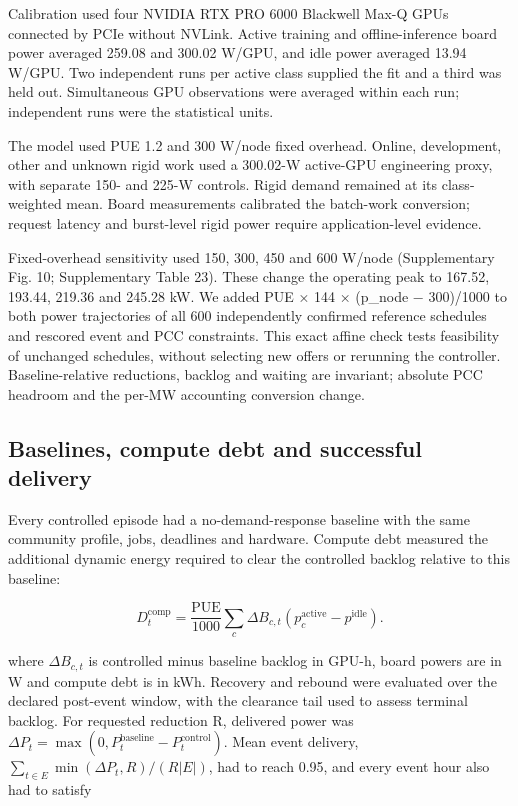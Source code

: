 \documentclass[10pt,a4paper]{article}
\begin{document}
Calibration used four NVIDIA RTX PRO 6000 Blackwell Max-Q GPUs connected by PCIe without NVLink. Active training and offline-inference board power averaged 259.08 and 300.02 W/GPU, and idle power averaged 13.94 W/GPU. Two independent runs per active class supplied the fit and a third was held out. Simultaneous GPU observations were averaged within each run; independent runs were the statistical units.


The model used PUE 1.2 and 300 W/node fixed overhead. Online, development, other and unknown rigid work used a 300.02-W active-GPU engineering proxy, with separate 150- and 225-W controls. Rigid demand remained at its class-weighted mean. Board measurements calibrated the batch-work conversion; request latency and burst-level rigid power require application-level evidence.


Fixed-overhead sensitivity used 150, 300, 450 and 600 W/node (Supplementary Fig. 10; Supplementary Table 23). These change the operating peak to 167.52, 193.44, 219.36 and 245.28 kW. We added PUE × 144 × (p\_node − 300)/1000 to both power trajectories of all 600 independently confirmed reference schedules and rescored event and PCC constraints. This exact affine check tests feasibility of unchanged schedules, without selecting new offers or rerunning the controller. Baseline-relative reductions, backlog and waiting are invariant; absolute PCC headroom and the per-MW accounting conversion change.


\subsection*{Baselines, compute debt and successful delivery}

Every controlled episode had a no-demand-response baseline with the same community profile, jobs, deadlines and hardware. Compute debt measured the additional dynamic energy required to clear the controlled backlog relative to this baseline:


\begin{equation*}
D^{\mathrm{comp}}_t=\frac{\mathrm{PUE}}{1000}\sum_c\Delta B_{c,t}\left(p^{\mathrm{active}}_c-p^{\mathrm{idle}}\right).
\end{equation*}

where \(\Delta B_{c,t}\) is controlled minus baseline backlog in GPU-h, board powers are in W and compute debt is in kWh. Recovery and rebound were evaluated over the declared post-event window, with the clearance tail used to assess terminal backlog. For requested reduction R, delivered power was \(\Delta P_t=\max(0,P^{\mathrm{baseline}}_t-P^{\mathrm{control}}_t)\). Mean event delivery, \(\sum_{t\in E}\min(\Delta P_t,R)/(R|E|)\), had to reach 0.95, and every event hour also had to satisfy
\end{document}
